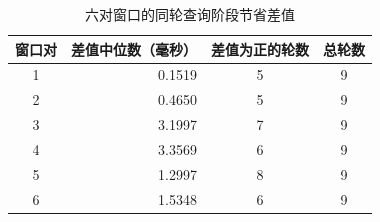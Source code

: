 \begin{table}[htbp]
\centering\small
\caption{六对窗口的同轮查询阶段节省差值}\label{tab:paired-saving}
\begin{tabular}{@{}crcc@{}}
\toprule
窗口对 & 差值中位数（毫秒） & 差值为正的轮数 & 总轮数\\
\midrule
1 & 0.1519 & 5 & 9\\
2 & 0.4650 & 5 & 9\\
3 & 3.1997 & 7 & 9\\
4 & 3.3569 & 6 & 9\\
5 & 1.2997 & 8 & 9\\
6 & 1.5348 & 6 & 9\\
\bottomrule
\end{tabular}
\end{table}
